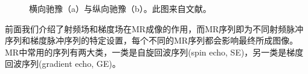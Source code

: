\begin{figure}[htbp]
\centering
{}
\centering
\caption{横向驰豫（a）与纵向驰豫（b）。此图来自文献\cite{haidekker2013medical}。}
\label{fig:t1t2}
\end{figure}

前面我们介绍了射频场和梯度场在MR成像的作用，而MR序列即为不同射频脉冲序列和梯度脉冲序列的特定设置，每个不同的MR序列都会影响最终所成图像。MR中常用的序列有两大类，一类是自旋回波序列(spin echo, SE)，另一类是梯度回波序列(gradient echo, GE)。

